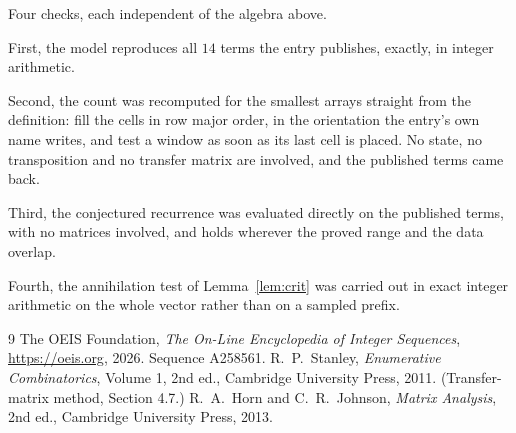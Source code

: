 \documentclass[11pt,a4paper]{article}
\theoremstyle{plain}
\theoremstyle{definition}
\begin{document}
Four checks, each independent of the algebra above.

First, the model reproduces all $14$ terms the entry publishes, exactly, in integer
arithmetic.

Second, the count was recomputed for the smallest arrays straight from the definition: fill the
cells in row major order, in the orientation the entry's own name writes, and test a window as
soon as its last cell is placed. No state, no transposition and no transfer matrix are
involved, and the published terms came back.

Third, the conjectured recurrence was evaluated directly on the published terms, with no
matrices involved, and holds wherever the proved range and the data overlap.

Fourth, the annihilation test of Lemma~\ref{lem:crit} was carried out in exact integer
arithmetic on the whole vector rather than on a sampled prefix.

\begin{thebibliography}{9}
 The OEIS Foundation, \emph{The On-Line Encyclopedia of Integer
Sequences}, \url{https://oeis.org}, 2026. Sequence A258561.
 R.~P.~Stanley, \emph{Enumerative Combinatorics}, Volume 1, 2nd ed.,
Cambridge University Press, 2011. (Transfer-matrix method, Section 4.7.)
 R.~A.~Horn and C.~R.~Johnson, \emph{Matrix Analysis}, 2nd ed., Cambridge
University Press, 2013.
\end{thebibliography}
\end{document}
